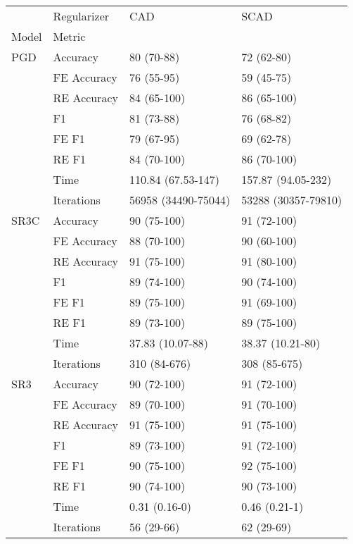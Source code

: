 \begin{tabular}{llll}
\toprule
    & Regularizer &                  CAD &                 SCAD \\
Model & Metric &                      &                      \\
\midrule
PGD & Accuracy &           80 (70-88) &           72 (62-80) \\
    & FE Accuracy &           76 (55-95) &           59 (45-75) \\
    & RE Accuracy &          84 (65-100) &          86 (65-100) \\
    & F1 &           81 (73-88) &           76 (68-82) \\
    & FE F1 &           79 (67-95) &           69 (62-78) \\
    & RE F1 &          84 (70-100) &          86 (70-100) \\
    & Time &   110.84 (67.53-147) &   157.87 (94.05-232) \\
    & Iterations &  56958 (34490-75044) &  53288 (30357-79810) \\
SR3C & Accuracy &          90 (75-100) &          91 (72-100) \\
    & FE Accuracy &          88 (70-100) &          90 (60-100) \\
    & RE Accuracy &          91 (75-100) &          91 (80-100) \\
    & F1 &          89 (74-100) &          90 (74-100) \\
    & FE F1 &          89 (75-100) &          91 (69-100) \\
    & RE F1 &          89 (73-100) &          89 (75-100) \\
    & Time &     37.83 (10.07-88) &     38.37 (10.21-80) \\
    & Iterations &         310 (84-676) &         308 (85-675) \\
SR3 & Accuracy &          90 (72-100) &          91 (72-100) \\
    & FE Accuracy &          89 (70-100) &          91 (70-100) \\
    & RE Accuracy &          91 (75-100) &          91 (75-100) \\
    & F1 &          89 (73-100) &          91 (72-100) \\
    & FE F1 &          90 (75-100) &          92 (75-100) \\
    & RE F1 &          90 (74-100) &          90 (73-100) \\
    & Time &        0.31 (0.16-0) &        0.46 (0.21-1) \\
    & Iterations &           56 (29-66) &           62 (29-69) \\
\bottomrule
\end{tabular}
